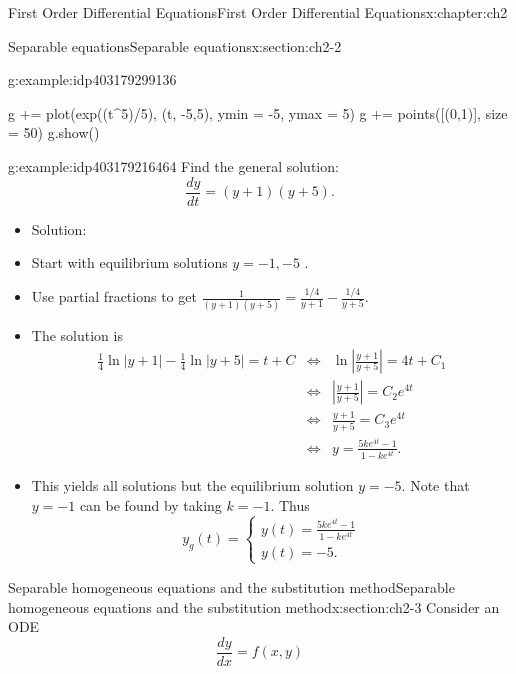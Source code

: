 \documentclass[oneside,10pt,]{book}
\numberwithin{equation}{section}
\numberwithin{equation}{section}
\newcommand{\amp}{&}
\begin{document}
\begin{chapterptx}{First Order Differential Equations}{}{First Order Differential Equations}{}{}{x:chapter:ch2}
\begin{sectionptx}{Separable equations}{}{Separable equations}{}{}{x:section:ch2-2}
\begin{example}{}{g:example:idp403179299136}
\begin{sageinput}
g += plot(exp((t^5)/5), (t, -5,5), ymin = -5, ymax = 5)
g += points([(0,1)], size = 50)
g.show()
\end{sageinput}
\end{example}
\begin{example}{}{g:example:idp403179216464}%
Find the general solution:%
\begin{equation*}
\frac{dy}{dt}=\left(y+1\right)\left(y+5\right).
\end{equation*}
%
%
\begin{itemize}[label=\textbullet]
\item{}Solution:%
\item{}Start with equilibrium solutions \(y=-1,-5\) .%
\item{}Use partial fractions to get \(\frac{1}{\left(y+1\right)\left(y+5\right)}=\frac{1/4}{y+1}-\frac{1/4}{y+5}\).%
\item{}The solution is%
\begin{align*}
\frac{1}{4}\ln\left|y+1\right|-\frac{1}{4}\ln\left|y+5\right|=t+C \amp \iff \amp \ln\left|\frac{y+1}{y+5}\right|=4t+C_{1}\\
\amp \iff \amp \left|\frac{y+1}{y+5}\right|=C_{2}e^{4t}\\
\amp \iff \amp \frac{y+1}{y+5}=C_{3}e^{4t}\\
\amp \iff \amp y=\frac{5ke^{4t}-1}{1-ke^{4t}}.
\end{align*}
%
\item{}This yields all solutions but the equilibrium solution \(y=-5\). Note that \(y=-1\) can be found by taking \(k=-1\). Thus%
\begin{equation*}
y_g(t) =  \begin{cases}
y(t)=\frac{5ke^{4t}-1}{1-ke^{4t}}\\
y(t)=-5.
\end{cases}
\end{equation*}
%
\end{itemize}
\end{example}
\end{sectionptx}
%
%
\typeout{************************************************}
\typeout{************************************************}
%
\begin{sectionptx}{Separable homogeneous equations and the substitution method}{}{Separable homogeneous equations and the substitution method}{}{}{x:section:ch2-3}
Consider an ODE%
\begin{equation*}
\frac{dy}{dx}=f\left(x,y\right)

\end{equation*}
\end{sectionptx}
\end{chapterptx}
\end{document}
